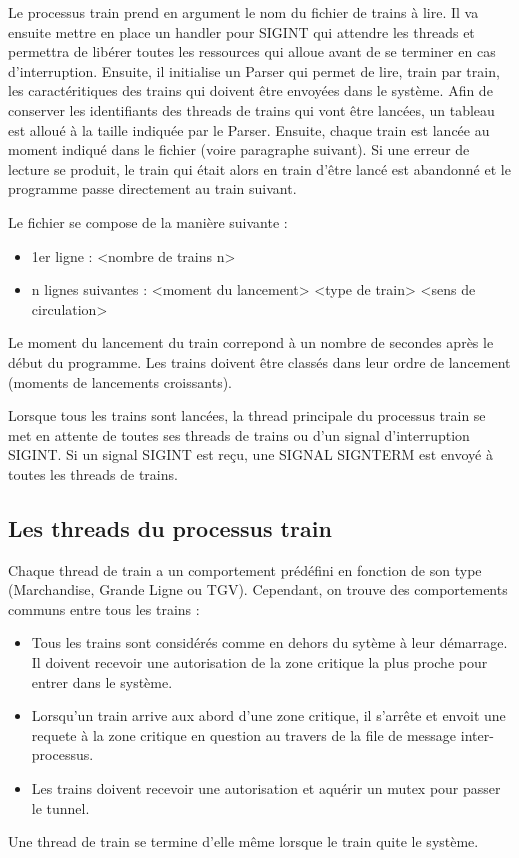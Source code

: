 \documentclass[a4paper,12pt]{article}
\begin{document}
Le processus train prend en argument le nom du fichier de trains à lire. Il va ensuite mettre en place un handler pour SIGINT qui attendre les threads et permettra de libérer toutes les ressources qui alloue avant de se terminer en cas d'interruption. Ensuite, il initialise un Parser qui permet de lire, train par train, les caractéritiques des trains qui doivent être envoyées dans le système. Afin de conserver les identifiants des threads de trains qui vont être lancées, un tableau est alloué à la taille indiquée par le Parser. Ensuite, chaque train est lancée au moment indiqué dans le fichier (voire paragraphe suivant). Si une erreur de lecture se produit, le train qui était alors en train d'être lancé est abandonné et le programme passe directement au train suivant.

Le fichier se compose de la manière suivante :
\begin{itemize}
	\item 1er ligne : <nombre de trains n>
	\item n lignes suivantes : <moment du lancement> <type de train> <sens de circulation>
\end{itemize}
Le moment du lancement du train correpond à un nombre de secondes après le début du programme. Les trains doivent être classés dans leur ordre de lancement (moments de lancements croissants).

Lorsque tous les trains sont lancées, la thread principale du processus train se met en attente de toutes ses threads de trains ou d'un signal d'interruption SIGINT. Si un signal SIGINT est reçu, une SIGNAL SIGNTERM est envoyé à toutes les threads de trains.

\subsection{Les threads du processus train}

Chaque thread de train a un comportement prédéfini en fonction de son type (Marchandise, Grande Ligne ou TGV). Cependant, on trouve des comportements communs entre tous les trains :
\begin{itemize}
	\item Tous les trains sont considérés comme en dehors du sytème à leur démarrage. Il doivent recevoir une autorisation de la zone critique la plus proche pour entrer dans le système.
	\item Lorsqu'un train arrive aux abord d'une zone critique, il s'arrête et envoit une requete à la zone critique en question au travers de la file de message inter-processus.
	\item Les trains doivent recevoir une autorisation et aquérir un mutex pour passer le tunnel.
\end{itemize}
Une thread de train se termine d'elle même lorsque le train quite le système.
\end{document}
